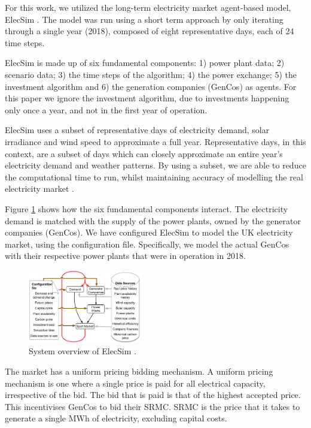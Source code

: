 \documentclass[conference]{IEEEtran}
\begin{document}
For this work, we utilized the long-term electricity market agent-based model, ElecSim \cite{Kell,Kell2020b}. The model was run using a short term approach by only iterating through a single year (2018), composed of eight representative days, each of 24 time steps.

ElecSim is made up of six fundamental components: 1) power plant data; 2) scenario data; 3) the time steps of the algorithm; 4) the power exchange; 5) the investment algorithm and 6) the generation companies (GenCos) as agents. For this paper we ignore the investment algorithm, due to investments happening only once a year, and not in the first year of operation. 

ElecSim uses a subset of representative days of electricity demand, solar irradiance and wind speed to approximate a full year. Representative days, in this context, are a subset of days which can closely approximate an entire year's electricity demand and weather patterns. By using a subset, we are able to reduce the computational time to run, whilst maintaining accuracy of modelling the real electricity market \cite{Kell2020}.

Figure \ref{fig:model_details} shows how the six fundamental components interact. The electricity demand is matched with the supply of the power plants, owned by the generator companies (GenCos). We have configured ElecSim to model the UK electricity market, using the configuration file. Specifically, we model the actual GenCos with their respective power plants that were in operation in 2018.



\begin{figure}
    \includegraphics[width=0.44\textwidth]{figures/methedology/System_overview_large.png}
    \caption{System overview of ElecSim \cite{Kell}.}
    \label{fig:model_details}
\end{figure}

The market has a uniform pricing bidding mechanism. A uniform pricing mechanism is one where a single price is paid for all electrical capacity, irrespective of the bid. The bid that is paid is that of the highest accepted price. This incentivises GenCos to bid their SRMC. SRMC is the price that it takes to generate a single MWh of electricity, excluding capital costs. 
\end{document}
